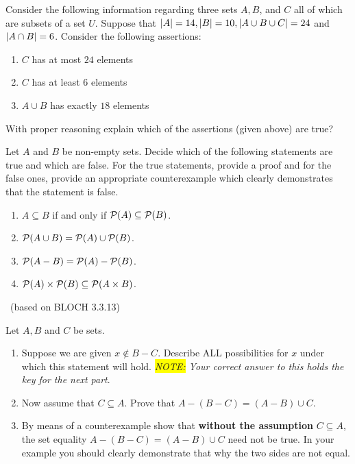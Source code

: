 \documentclass[11pt]{article}
\newcounter{Quesnumb}  %
\newcommand{\problemnum}{%
            \addtocounter{Quesnumb}{1}%
            \arabic{Quesnumb}}
\begin{document}
\begin{problem}{\problemnum}
Consider the following information regarding three sets $A, B$, and $C$ all of
which are subsets of a set $U$. Suppose that $\abs{A} = 14, \abs{B} = 10, \abs{A \cup B \cup C} = 24$ and $\abs{A \cap B} = 6$.
Consider the following assertions:
\begin{enumerate}
    \item $C$ has at most $24$ elements
    \item $C$ has at least $6$ elements
    \item $A \cup B$ has exactly $18$ elements
\end{enumerate}
With proper reasoning explain which of the assertions (given above) are true?
\end{problem}

\begin{problem}{\problemnum}
Let $A$ and $B$ be non-empty sets. Decide which of the following statements are true and which are false. For the true statements, provide a proof and for the false ones, provide an appropriate counterexample which clearly demonstrates that the statement is false.
\begin{enumerate}[label=\alph*).]
    \item $A \subseteq B$ if and only if $\power[A] \subseteq \power[B]$.
    \item $\power[A \cup B]=\power[A] \cup \power[B]$.
    \item $\power[A - B]=\power[A] - \power[B]$.
    \item $\power[A] \times \power[B] \subseteq \power[A \times B]$.
\end{enumerate}
\end{problem}

\begin{problem}{\problemnum \, \textsf{(based on BLOCH 3.3.13)}}
Let $A, B$ and $C$ be sets.
\begin{enumerate}[label=\alph*).]
    \item Suppose we are given $x \not\in B-C$. Describe ALL possibilities for $x$ under which this statement will hold. \textit{\colorbox{yellow}{NOTE:} Your correct answer to this holds the key for the next part}.
    \item Now assume that $C \subseteq A$. Prove that $A-(B-C)=(A-B) \cup C$.
    \item By means of a counterexample show that \textbf{without the assumption} $C \subseteq A$, the set equality $A-(B-C)=(A-B) \cup C$ need not be true. In your example you should clearly demonstrate that why the two sides are not equal.
\end{enumerate}
\end{problem}
\end{document}
